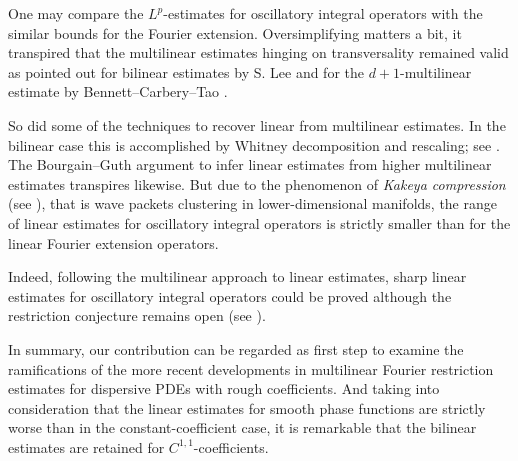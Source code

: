\documentclass{amsart}
\theoremstyle{definition}
\begin{document}
\medskip

One may compare the $L^p$-estimates for oscillatory integral operators with the similar bounds for the Fourier extension. Oversimplifying matters a bit, it transpired that the multilinear estimates hinging on transversality remained valid as pointed out for bilinear estimates by S. Lee \cite{Lee2006} and for the $d+1$-multilinear estimate by Bennett--Carbery--Tao \cite{BennettCarberyTao2006}. 

So did some of the techniques to recover linear from multilinear estimates. In the bilinear case this is accomplished by Whitney decomposition and rescaling; see \cite{TaoVargasVega1998}. The Bourgain--Guth \cite{BourgainGuth2011} argument to infer linear estimates from higher multilinear estimates transpires likewise. But due to the phenomenon of \emph{Kakeya compression} (see \cite{Wisewell2005,GuthHickmanIliopoulou2019}), that is wave packets clustering in lower-dimensional manifolds, the range of linear estimates for oscillatory integral operators is strictly smaller than for the linear Fourier extension operators.

Indeed, following the multilinear approach to linear estimates, sharp linear estimates for oscillatory integral operators could be proved although the restriction conjecture remains open (see \cite{Lee2006,BourgainGuth2011,GuthHickmanIliopoulou2019,Schippa2024Oscillatory}).

\medskip

In summary, our contribution can be regarded as first step to examine the ramifications of the more recent developments in multilinear Fourier restriction estimates for dispersive PDEs with rough coefficients. And taking into consideration that the linear estimates for smooth phase functions are strictly worse than in the constant-coefficient case, it is remarkable that the bilinear estimates are retained for $C^{1,1}$-coefficients.

\bigskip
\end{document}
